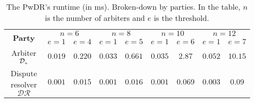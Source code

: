 

 \begin{table*}[!htb]

\caption{ \small The PwDR's runtime (in ms). Broken-down by parties. In the table, $n$ is the number of arbiters and $e$ is the threshold.} \label{table::PwDR-runtime} 
 \vspace{-2mm}
\begin{center}

\begin{tabular}{|c|c|c|c|c|c|c|c|c|} 

   \hline
   

\multirow{2}{*}{\scriptsize \textbf{Party}}& \multicolumn{2}{c|}{\scriptsize $n=6$}& \multicolumn{2}{c|}{\scriptsize $n=8$}&\multicolumn{2}{c|}{\scriptsize $n=10$}&\multicolumn{2}{c|}{\scriptsize $n=12$}\\
 \cline{2-9} 
&\scriptsize$e=1$&\scriptsize$e=4$&\scriptsize$e=1$ &\scriptsize$e=5$&\scriptsize$e=1$&\scriptsize$e=6$&\scriptsize$e=1$&\scriptsize$e=7$\\

\hline

         
            \cline{1-5} 

 
   \scriptsize   {Arbiter $\mathcal{D}_{\scriptscriptstyle n}$ }&  \cellcolor{gray!20}\scriptsize$0.019$&  \cellcolor{gray!20}\scriptsize$0.220$& \cellcolor{gray!20}  \scriptsize$0.033$&   \cellcolor{gray!20}\scriptsize$0.661$&  \cellcolor{gray!20}\scriptsize$0.035$&  \cellcolor{gray!20}\scriptsize$2.87$&  \cellcolor{gray!20}\scriptsize$0.052$&  \cellcolor{gray!20}\scriptsize$10.15$\\      
           
            \cline{1-9} 

 \scriptsize Dispute resolver $\mathcal{DR}$&  \cellcolor{gray!20}\scriptsize$0.001$&  \cellcolor{gray!20}\scriptsize$0.015$&   \cellcolor{gray!20}\scriptsize $0.001$&   \cellcolor{gray!20}\scriptsize$0.016$&  \cellcolor{gray!20}\scriptsize$0.001$&  \cellcolor{gray!20}\scriptsize$0.069$&  \cellcolor{gray!20}\scriptsize$0.003$&  \cellcolor{gray!20}\scriptsize$0.09$\\
 
 \hline
 
\end{tabular}  %
\end{center}

\end{table*}





